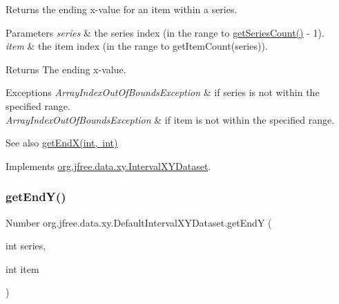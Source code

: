 Returns the ending x-\/value for an item within a series.


\begin{DoxyParams}{Parameters}
{\em series} & the series index (in the range {} to {\ttfamily \mbox{\hyperlink{classorg_1_1jfree_1_1data_1_1xy_1_1_default_interval_x_y_dataset_a11470bfa9b540c971123d4282c0f5a8a}{get\+Series\+Count()}} -\/ 1}). \\
\hline
{\em item} & the item index (in the range {} to {\ttfamily get\+Item\+Count(series)}).\\
\hline
\end{DoxyParams}
\begin{DoxyReturn}{Returns}
The ending x-\/value.
\end{DoxyReturn}

\begin{DoxyExceptions}{Exceptions}
{\em Array\+Index\+Out\+Of\+Bounds\+Exception} & if {\ttfamily series} is not within the specified range. \\
\hline
{\em Array\+Index\+Out\+Of\+Bounds\+Exception} & if {\ttfamily item} is not within the specified range.\\
\hline
\end{DoxyExceptions}
\begin{DoxySeeAlso}{See also}
\mbox{\hyperlink{classorg_1_1jfree_1_1data_1_1xy_1_1_default_interval_x_y_dataset_aadfc488215db1fe288e23180b78d5d67}{get\+End\+X(int, int)}} 
\end{DoxySeeAlso}


Implements \mbox{\hyperlink{interfaceorg_1_1jfree_1_1data_1_1xy_1_1_interval_x_y_dataset_ad976e66caa1fc4d72a599f2c26c55dcc}{org.\+jfree.\+data.\+xy.\+Interval\+X\+Y\+Dataset}}.

\mbox{\label{classorg_1_1jfree_1_1data_1_1xy_1_1_default_interval_x_y_dataset_aed7774df9c641523b66b02e176b813ed}} 
\subsubsection{\texorpdfstring{get\+End\+Y()}{getEndY()}}
{\footnotesize\ttfamily Number org.\+jfree.\+data.\+xy.\+Default\+Interval\+X\+Y\+Dataset.\+get\+EndY (\begin{DoxyParamCaption}\item[{int}]{series,  }\item[{int}]{item }\end{DoxyParamCaption})}

